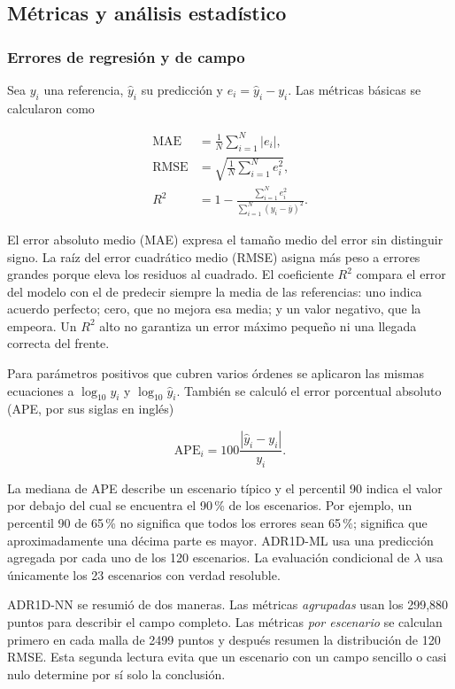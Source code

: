 \documentclass[11pt,a4paper]{article}
\begin{document}
\subsection{Métricas y análisis estadístico}

\subsubsection{Errores de regresión y de campo}

Sea $y_i$ una referencia, $\widehat y_i$ su predicción y
$e_i=\widehat y_i-y_i$. Las métricas básicas se calcularon como

\begin{align}
\mathrm{MAE}&=\frac{1}{N}\sum_{i=1}^{N}|e_i|,\\
\mathrm{RMSE}&=\sqrt{\frac{1}{N}\sum_{i=1}^{N}e_i^2},\\
R^2&=1-\frac{\sum_{i=1}^{N}e_i^2}
{\sum_{i=1}^{N}(y_i-\overline y)^2}.
\label{eq:regression-metrics}
\end{align}

El error absoluto medio (MAE) expresa el tamaño medio del error sin distinguir
signo. La raíz del error cuadrático medio (RMSE) asigna más peso a errores
grandes porque eleva los residuos al cuadrado. El
coeficiente $R^2$ compara el error del modelo con el de predecir siempre la
media de las referencias: uno indica acuerdo perfecto; cero, que no mejora esa
media; y un valor negativo, que la empeora. Un $R^2$ alto no garantiza un error
máximo pequeño ni una llegada correcta del frente.

Para parámetros positivos que cubren varios órdenes se aplicaron las mismas
ecuaciones a $\log_{10}y_i$ y $\log_{10}\widehat y_i$. También se calculó el
error porcentual absoluto (APE, por sus siglas en inglés)

\begin{equation}
\mathrm{APE}_i=100\frac{|\widehat y_i-y_i|}{y_i}.
\label{eq:ape}
\end{equation}

La mediana de APE describe un escenario típico y el percentil 90 indica el
valor por debajo del cual se encuentra el 90\,\% de los escenarios. Por
ejemplo, un percentil 90 de 65\,\% no significa que todos los errores sean
65\,\%; significa que aproximadamente una décima parte es mayor. ADR1D-ML usa
una predicción agregada por cada uno de los 120 escenarios. La evaluación
condicional de $\lambda$ usa únicamente los 23 escenarios con verdad resoluble.

ADR1D-NN se resumió de dos maneras. Las métricas \emph{agrupadas} usan los
299,880 puntos para describir el campo completo. Las métricas \emph{por
escenario} se calculan primero en cada malla de 2499 puntos y después resumen
la distribución de 120 RMSE. Esta segunda lectura evita que un escenario con
un campo sencillo o casi nulo determine por sí solo la conclusión.
\end{document}
